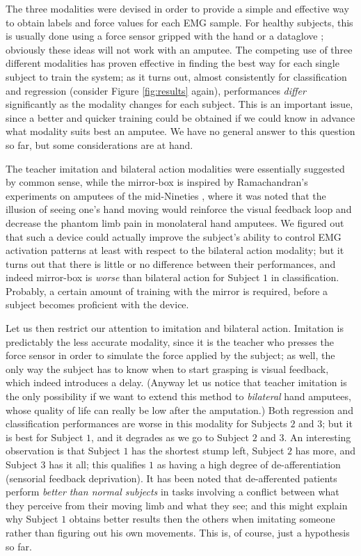 The three modalities were devised in order to provide a simple and effective
way to obtain labels and force values for each EMG sample. For healthy
subjects, this is usually done using a force sensor gripped with the hand
\cite{2008.BioCyb} or a dataglove \cite{sebelius}; obviously these ideas
will not work with an amputee.
The competing use of three different modalities has proven effective in finding
the best way for each single subject to train the system; as it turns out,
almost consistently for classification and regression (consider Figure
\ref{fig:results} again), performances \emph{differ} significantly as
the modality changes for each subject. This is an important issue, since
a better and quicker training could be obtained if we could
know in advance what modality suits best an amputee. We have no general
answer to this question so far, but some considerations are at hand.

The teacher imitation and bilateral action
modalities were essentially suggested by common sense, while the mirror-box
is inspired by Ramachandran's experiments on amputees of the
mid-Nineties \cite{ramachandran96}, where it was noted that the illusion of
seeing one's hand moving would reinforce the visual feedback loop and decrease
the phantom limb pain in monolateral hand amputees. We figured out that such
a device could actually improve the subject's ability to control EMG
activation patterns at least with respect to the bilateral action modality;
but it turns out that there is little or no difference between their performances,
and indeed mirror-box is \emph{worse} than bilateral action for Subject $1$ in
classification. Probably, a certain amount of training with the mirror is required,
before a subject becomes proficient with the device.

Let us then restrict our attention to imitation and bilateral action.
Imitation is predictably the less accurate modality, since it is the
teacher who presses the force sensor in order to simulate the force applied by the
subject; as well, the only way the subject has to know when to start grasping
is visual feedback, which indeed introduces a delay. (Anyway let us notice that
teacher imitation is the only possibility if we want to extend this method to
\emph{bilateral} hand amputees, whose quality of life can really be low after
the amputation.)
Both regression and classification performances are worse in this modality for Subjects
$2$ and $3$; but it is best for Subject $1$, and it degrades
as we go to Subject $2$ and $3$. An interesting observation is that Subject $1$
has the shortest stump left, Subject $2$ has more, and Subject $3$ has it all;
this qualifies $1$ as having a high degree of de-afferentiation (sensorial
feedback deprivation). It has been noted \cite{lajoie02,miall07}
that de-afferented patients perform \emph{better than normal subjects}
in tasks involving a conflict between what they perceive from their
moving limb and what they see; and this might explain why Subject $1$
obtains better results then the others when imitating someone rather
than figuring out his own movements. This is, of course, just a
hypothesis so far.
